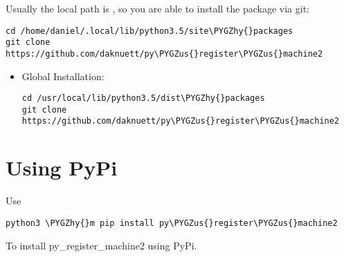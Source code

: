 \documentclass[letterpaper,10pt,english]{sphinxmanual}
\def\PYGZus{\char`\_}
\def\PYGZhy{\char`\-}
\begin{document}
Usually the local path is , so you are able to install the package via git:

\begin{Verbatim}[commandchars=\\\{\}]
cd /home/daniel/.local/lib/python3.5/site\PYGZhy{}packages
git clone https://github.com/daknuett/py\PYGZus{}register\PYGZus{}machine2
\end{Verbatim}
\begin{itemize}
\item {} 
Global Installation:

\begin{Verbatim}[commandchars=\\\{\}]
cd /usr/local/lib/python3.5/dist\PYGZhy{}packages
git clone https://github.com/daknuett/py\PYGZus{}register\PYGZus{}machine2
\end{Verbatim}

\end{itemize}


\section{Using PyPi}
\label{install:using-pypi}
Use

\begin{Verbatim}[commandchars=\\\{\}]
python3 \PYGZhy{}m pip install py\PYGZus{}register\PYGZus{}machine2
\end{Verbatim}

To install py\_register\_machine2 using PyPi.
\end{document}
